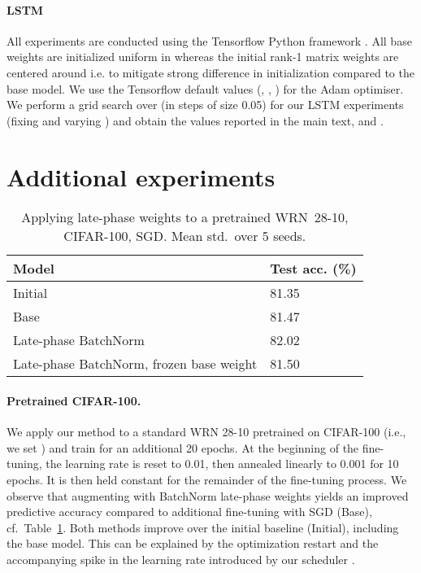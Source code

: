 \documentclass{article} \usepackage{iclr2021_conference,times}
\begin{document}
\paragraph{LSTM}

All experiments are conducted using the Tensorflow Python framework \citep{abadi_tensorflow_2016}. All base weights are initialized uniform in  whereas the initial rank-1 matrix weights are centered around  i.e.  to mitigate strong difference in initialization compared to the base model. We use the Tensorflow default values (, , ) for the Adam optimiser. We perform a grid search over  (in steps of size 0.05) for our LSTM experiments (fixing  and varying ) and obtain the values reported in the main text,  and .

\section{Additional experiments}
\label{apx:extra-expt}
\begin{table}[h!]
\centering
  \caption{Applying late-phase weights to a pretrained WRN~28-10, CIFAR-100, SGD. Mean  std.~over 5 seeds.}
  \label{tab:pretrained-c100}
  \vspace{-0.2cm}
  \centering
    \begin{tabular}{ll}
    \toprule
    Model    & Test acc. (\%) \\\midrule
    Initial &  81.35 \\
    Base &  81.47    \\
    Late-phase BatchNorm & 82.02 \\
    Late-phase BatchNorm, frozen base weight  &  81.50  \\\bottomrule  
    \end{tabular}
\end{table}

\paragraph{Pretrained CIFAR-100.}
We apply our method to a standard WRN 28-10 pretrained on CIFAR-100 (i.e., we set ) and train for an additional 20 epochs. At the beginning of the fine-tuning, the learning rate is reset to 0.01, then annealed linearly to 0.001 for 10 epochs. It is then held constant for the remainder of the fine-tuning process. We observe that augmenting with BatchNorm late-phase weights yields an improved predictive accuracy compared to additional fine-tuning with SGD (Base), cf.~Table~\ref{tab:pretrained-c100}. Both methods improve over the initial baseline (Initial), including the base model. This can be explained by the optimization restart and the accompanying spike in the learning rate introduced by our scheduler \citep{loshchilov_sgdr_2017}.
\end{document}
